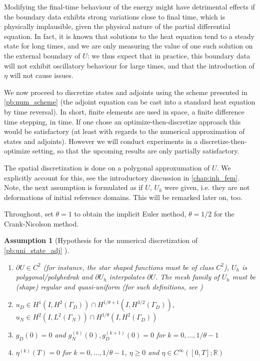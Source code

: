 \documentclass[english,a4paper,9pt,oneside]{scrbook}	%
\theoremstyle{break}
\newtheorem{ass}[equation]{Assumption}
\theoremstyle{remark}
\newcommand{\mR}{\mathbb{R}}
\begin{document}
Modifying the final-time behaviour of the energy might have detrimental effects if the boundary data exhibts strong variations close to final time, which is physically implausible, given the physical nature of the partial differential equation. In fact, it is known that solutions to the heat equation tend to a steady state for long times, and we are only measuring the value of one such solution on the external boundary of $U$: we thus expect that in practice, this boundary data will not exhibit oscillatory behaviour for large times, and that the introduction of $\eta$ will not cause issues.

We now proceed to discretize states and adjoints using the scheme presented in \cref{pb:num_scheme} (the adjoint equation can be cast into a standard heat equation by time reversal). In short, finite elements are used in space, a finite difference time stepping, in time. If one chose an optimize-then-discretize approach this would be satisfactory (at least with regards to the numerical approximation of states and adjoints). However we will conduct experiments in a discretize-then-optimize setting, so that the upcoming results are only partially satisfactory.

The spatial discretization is done on a polygonal approxumation of $U$. We explicitly account for this, see the introductory discussion in \cref{chap:inh_fem}. Note, the next assumption is formulated as if $U$, $U_h$ were given, i.e. they are not deformations of initial reference domains. This will be remarked later on, too. 

Throughout, set $\theta=1$ to obtain the implicit Euler method, $\theta=1/2$ for the Crank-Nicolson method.

\begin{ass}[Hypothesis for the numerical discretization of \cref{pb:uni_state_adj} ]
\label{ass:num_discr_shopt}
\textcolor{white}{ }
\begin{enumerate}
	\item $\partial U \in C^2$ (for instance, the star shaped functions must be of class $C^2$), $U_h$ is polygonal/polyhedrak and $\partial U_h$ interpolates $\partial U$. The mesh family of $U_h$ must be (shape) regular and quasi-uniform (for such definitions, see \cite{brenner_scott})
	\item $u_D \in H^1(I, H^{2}(\Gamma_D)) \cap H^{1/\theta+1}(I,H^{3/2}(\Gamma_D))$, $u_N \in H^2(I,L^2(\Gamma_N)) \cap H^{1/\theta}(I, H^2(\Gamma_D))$
	\item $g_D(0)=0$ and $g_N^{(k)}(0), g_D^{(k+1)}(0)  = 0$ for $k=0,..., 1/\theta-1$
	\item $\eta^{(k)}(T)  = 0$ for $k=0,..., 1/\theta-1$, $\eta \geq 0$ and $\eta \in C^{\infty}([0,T];\mR)$
\end{enumerate}

\end{ass}
\end{document}
